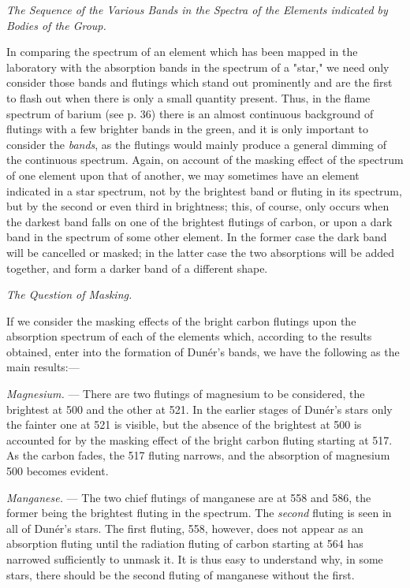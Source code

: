 \documentclass[a4paper, 12pt, oneside, polutonikogreek, english]{article}
\begin{document}
\emph{The Sequence of the Various Bands in the Spectra of the Elements indicated by Bodies of the Group.}

In comparing the spectrum of an element which has been mapped in the laboratory with the absorption bands in the spectrum of a "star," we need only consider those bands and flutings which stand out prominently and are the first to flash out when there is only a small quantity present. Thus, in the flame spectrum of barium (see p. 36) there is an almost continuous background of flutings with a few brighter bands in the green, and it is only important to consider the \emph{bands}, as the flutings would mainly produce a general dimming of the continuous spectrum. Again, on account of the masking effect of the spectrum of one element upon that of another, we may sometimes have an element indicated in a star spectrum, not by the brightest band or fluting in its spectrum, but by the second or even third in brightness; this, of course, only occurs when the darkest band falls on one of the brightest flutings of carbon, or upon a dark band in the spectrum of some other element. In the former case the dark band will be cancelled or masked; in the latter case the two absorptions will be added together, and form a darker band of a different shape.

\emph{The Question of Masking.}

If we consider the masking effects of the bright carbon flutings upon the absorption spectrum of each of the elements which, according to the results obtained, enter into the formation of Dunér's bands, we have the following as the main results:---

\emph{Magnesium.} --- There are two flutings of magnesium to be considered, the brightest at 500 and the other at 521. In the earlier stages of Dunér's stars only the fainter one at 521 is visible, but the absence of the brightest at 500 is accounted for by the masking effect of the bright carbon fluting starting at 517. As the carbon fades, the 517 fluting narrows, and the absorption of magnesium 500 becomes evident.

\emph{Manganese.} --- The two chief flutings of manganese are at 558 and 586, the former being the brightest fluting in the spectrum. The \emph{second} fluting is seen in all of Dunér's stars. The first fluting, 558, however, does not appear as an absorption fluting until the radiation fluting of carbon starting at 564 has narrowed sufficiently to unmask it. It is thus easy to understand why, in some stars, there should be the second fluting of manganese without the first.
\end{document}
